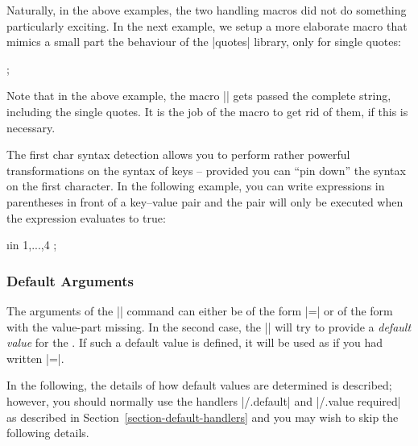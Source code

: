Naturally, in the above examples, the two handling macros did not do something
particularly exciting. In the next example, we setup a more elaborate macro
that mimics a small part the behaviour of the |quotes| library, only for single
quotes:
%
\begin{codeexample}[]

\def\mysinglequotemacro#1{\pgfkeysalso{label={#1}}}

\tikz {};
\end{codeexample}

Note that in the above example, the macro |\mysinglequotemacro| gets passed the
complete string, including the single quotes. It is the job of the macro to get
rid of them, if this is necessary.

The first char syntax detection allows you to perform rather powerful
transformations on the syntax of keys -- provided you can ``pin down'' the
syntax on the first character. In the following example, you can write
expressions in parentheses in front of a key--value pair and the pair will only
be executed when the expression evaluates to true:
%
\begin{codeexample}[]

\def\myparamacro#1{\myparaparser#1\someendtext}
\def\myparaparser(#1)#2\someendtext{
  \ifx\pgfmathresult\onetext
  \fi
}
\def\onetext{1}

\foreach \i in {1,...,4}
  \tikz {};
\end{codeexample}


\subsubsection{Default Arguments}

The arguments of the |\pgfkeys| command can either be of the form
|=| or of the form  with the value-part
missing. In the second case, the |\pgfkeys| will try to provide a \emph{default
value} for the . If such a default value is defined, it will be
used as if you had written |=|.

In the following, the details of how default values are determined is
described; however, you should normally use the handlers |/.default| and
|/.value required| as described in Section~\ref{section-default-handlers} and
you may wish to skip the following details.


